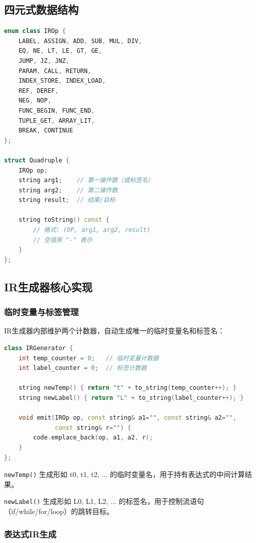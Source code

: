 \documentclass[12pt,a4paper]{ctexart}
\begin{document}
\subsection{四元式数据结构}

\begin{lstlisting}[language=C++, caption={四元式数据结构}]
enum class IROp {
    LABEL, ASSIGN, ADD, SUB, MUL, DIV,
    EQ, NE, LT, LE, GT, GE,
    JUMP, JZ, JNZ,
    PARAM, CALL, RETURN,
    INDEX_STORE, INDEX_LOAD,
    REF, DEREF,
    NEG, NOP,
    FUNC_BEGIN, FUNC_END,
    TUPLE_GET, ARRAY_LIT,
    BREAK, CONTINUE
};

struct Quadruple {
    IROp op;
    string arg1;    // 第一操作数（或标签名）
    string arg2;    // 第二操作数
    string result;  // 结果/目标

    string toString() const {
        // 格式: (OP, arg1, arg2, result)
        // 空值用 "-" 表示
    }
};
\end{lstlisting}

\subsection{IR生成器核心实现}

\subsubsection{临时变量与标签管理}

IR生成器内部维护两个计数器，自动生成唯一的临时变量名和标签名：

\begin{lstlisting}[language=C++, caption={临时变量与标签管理}]
class IRGenerator {
    int temp_counter = 0;   // 临时变量计数器
    int label_counter = 0;  // 标签计数器

    string newTemp() { return "t" + to_string(temp_counter++); }
    string newLabel() { return "L" + to_string(label_counter++); }

    void emit(IROp op, const string& a1="", const string& a2="",
              const string& r="") {
        code.emplace_back(op, a1, a2, r);
    }
};
\end{lstlisting}

\texttt{newTemp()} 生成形如 t0, t1, t2, ... 的临时变量名，用于持有表达式的中间计算结果。

\texttt{newLabel()} 生成形如 L0, L1, L2, ... 的标签名，用于控制流语句（if/while/for/loop）的跳转目标。

\subsubsection{表达式IR生成}
\end{document}

